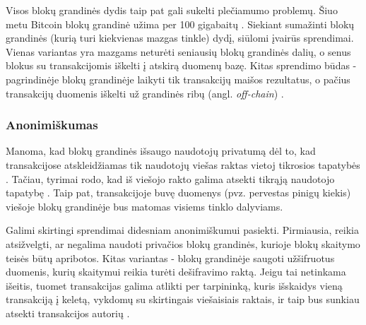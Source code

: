 Visos blokų grandinės dydis taip pat gali sukelti plečiamumo problemų. Šiuo metu Bitcoin blokų grandinė užima per 100 gigabaitų \cite{Zheng2017}. Siekiant sumažinti blokų grandinės
(kurią turi kiekvienas mazgas tinkle) dydį,
siūlomi įvairūs sprendimai. Vienas variantas yra mazgams neturėti seniausių blokų grandinės dalių, o senus blokus su transakcijomis iškelti į atskirą duomenų bazę.
Kitas sprendimo būdas - pagrindinėje blokų grandinėje laikyti tik transakcijų maišos rezultatus, o pačius transakcijų duomenis
iškelti už grandinės ribų (angl. \textit{off-chain}) \cite{Lo2017}.

\subsubsection{Anonimiškumas}

Manoma, kad blokų grandinės išsaugo naudotojų privatumą dėl to, kad transakcijose atskleidžiamas tik naudotojų
viešas raktas vietoj tikrosios tapatybės \cite{Zheng2017}. Tačiau, tyrimai rodo, kad iš viešojo rakto galima
atsekti tikrąją naudotojo tapatybę \cite{Barcelo2007}. Taip pat, transakcijoje buvę duomenys (pvz. pervestas pinigų kiekis)
viešoje blokų grandinėje bus matomas visiems tinklo dalyviams.

Galimi skirtingi sprendimai didesniam anonimiškumui pasiekti. Pirmiausia, reikia atsižvelgti, ar negalima naudoti privačios blokų grandinės, kurioje
blokų skaitymo teisės būtų apribotos. Kitas variantas - blokų grandinėje saugoti užšifruotus duomenis, kurių skaitymui
reikia turėti dešifravimo raktą. Jeigu tai netinkama išeitis, tuomet transakcijas galima atlikti per tarpininką, kuris išskaidys vieną transakciją
į keletą, vykdomų su skirtingais viešaisiais raktais, ir taip bus sunkiau atsekti transakcijos autorių \cite{Zheng2017}.

